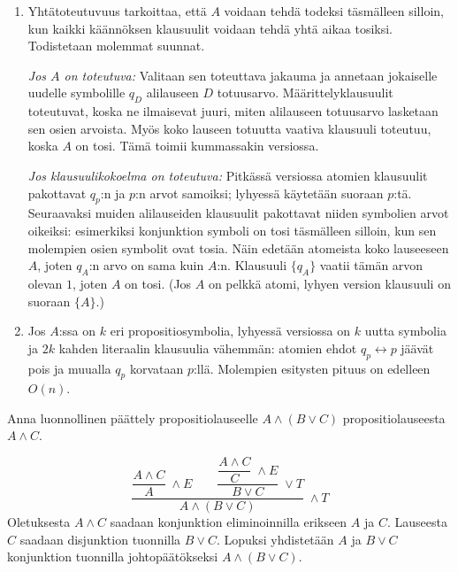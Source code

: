 \documentclass[11pt,a4paper]{amsart}
\begin{document}
\begin{solution}
\leavevmode\par
\begin{enumerate}[label=\alph*)]
\item Yhtätoteutuvuus tarkoittaa, että \(A\) voidaan tehdä todeksi
täsmälleen silloin, kun kaikki käännöksen klausuulit voidaan tehdä
yhtä aikaa tosiksi. Todistetaan molemmat suunnat.

\emph{Jos \(A\) on toteutuva:} Valitaan sen toteuttava jakauma ja
annetaan jokaiselle uudelle symbolille \(q_D\) alilauseen \(D\)
totuusarvo. Määrittelyklausuulit toteutuvat, koska ne ilmaisevat
juuri, miten alilauseen totuusarvo lasketaan sen osien arvoista.
Myös koko lauseen totuutta vaativa klausuuli toteutuu, koska
\(A\) on tosi. Tämä toimii kummassakin versiossa.

\emph{Jos klausuulikokoelma on toteutuva:} Pitkässä versiossa
atomien klausuulit pakottavat \(q_p\):n ja \(p\):n arvot samoiksi;
lyhyessä käytetään suoraan \(p\):tä. Seuraavaksi muiden
alilauseiden klausuulit pakottavat niiden symbolien arvot oikeiksi:
esimerkiksi konjunktion symboli on tosi täsmälleen silloin, kun
sen molempien osien symbolit ovat tosia. Näin edetään atomeista
koko lauseeseen \(A\), joten \(q_A\):n arvo on sama kuin \(A\):n.
Klausuuli \(\{q_A\}\) vaatii tämän arvon olevan \(1\), joten
\(A\) on tosi. (Jos \(A\) on pelkkä atomi, lyhyen version
klausuuli on suoraan \(\{A\}\).)

\item Jos \(A\):ssa on \(k\) eri propositiosymbolia, lyhyessä
versiossa on \(k\) uutta symbolia ja \(2k\) kahden literaalin
klausuulia vähemmän: atomien ehdot \(q_p\leftrightarrow p\)
jäävät pois ja muualla \(q_p\) korvataan \(p\):llä.
Molempien esitysten pituus on edelleen \(O(n)\).
\end{enumerate}
\end{solution}

\begin{exercise}
Anna luonnollinen päättely propositiolauseelle \(A \land (B \lor C)\)
propositiolauseesta \(A \land C\).
\end{exercise}

\begin{solution}
\[
\dfrac{
\dfrac{A\land C}{A}\;\land E
\qquad
\dfrac{\dfrac{A\land C}{C}\;\land E}{B\lor C}\;\lor T
}{A\land(B\lor C)}\;\land T
\]
Oletuksesta \(A\land C\) saadaan konjunktion eliminoinnilla erikseen
\(A\) ja \(C\). Lauseesta \(C\) saadaan disjunktion tuonnilla
\(B\lor C\). Lopuksi yhdistetään \(A\) ja \(B\lor C\)
konjunktion tuonnilla johtopäätökseksi \(A\land(B\lor C)\).
\end{solution}
\end{document}

